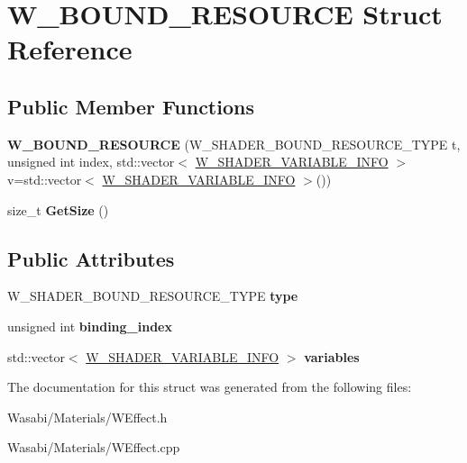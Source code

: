 \hypertarget{struct_w___b_o_u_n_d___r_e_s_o_u_r_c_e}{}\section{W\+\_\+\+B\+O\+U\+N\+D\+\_\+\+R\+E\+S\+O\+U\+R\+CE Struct Reference}
\label{struct_w___b_o_u_n_d___r_e_s_o_u_r_c_e}
\subsection*{Public Member Functions}
\begin{DoxyCompactItemize}
\item 
{\bfseries W\+\_\+\+B\+O\+U\+N\+D\+\_\+\+R\+E\+S\+O\+U\+R\+CE} (W\+\_\+\+S\+H\+A\+D\+E\+R\+\_\+\+B\+O\+U\+N\+D\+\_\+\+R\+E\+S\+O\+U\+R\+C\+E\+\_\+\+T\+Y\+PE t, unsigned int index, std\+::vector$<$ \hyperlink{struct_w___s_h_a_d_e_r___v_a_r_i_a_b_l_e___i_n_f_o}{W\+\_\+\+S\+H\+A\+D\+E\+R\+\_\+\+V\+A\+R\+I\+A\+B\+L\+E\+\_\+\+I\+N\+FO} $>$ v=std\+::vector$<$ \hyperlink{struct_w___s_h_a_d_e_r___v_a_r_i_a_b_l_e___i_n_f_o}{W\+\_\+\+S\+H\+A\+D\+E\+R\+\_\+\+V\+A\+R\+I\+A\+B\+L\+E\+\_\+\+I\+N\+FO} $>$())\hypertarget{struct_w___b_o_u_n_d___r_e_s_o_u_r_c_e_a4e37d8d03ddab7339eb6b2b9e52453bd}{}\label{struct_w___b_o_u_n_d___r_e_s_o_u_r_c_e_a4e37d8d03ddab7339eb6b2b9e52453bd}

\item 
size\+\_\+t {\bfseries Get\+Size} ()\hypertarget{struct_w___b_o_u_n_d___r_e_s_o_u_r_c_e_a4316bb3b61abf67c9c4d1816175d38d1}{}\label{struct_w___b_o_u_n_d___r_e_s_o_u_r_c_e_a4316bb3b61abf67c9c4d1816175d38d1}

\end{DoxyCompactItemize}
\subsection*{Public Attributes}
\begin{DoxyCompactItemize}
\item 
W\+\_\+\+S\+H\+A\+D\+E\+R\+\_\+\+B\+O\+U\+N\+D\+\_\+\+R\+E\+S\+O\+U\+R\+C\+E\+\_\+\+T\+Y\+PE {\bfseries type}\hypertarget{struct_w___b_o_u_n_d___r_e_s_o_u_r_c_e_aba210bfb28ce06d4ab333eeab7877222}{}\label{struct_w___b_o_u_n_d___r_e_s_o_u_r_c_e_aba210bfb28ce06d4ab333eeab7877222}

\item 
unsigned int {\bfseries binding\+\_\+index}\hypertarget{struct_w___b_o_u_n_d___r_e_s_o_u_r_c_e_ae50619693d5d7b0ce92770fedebcf7a7}{}\label{struct_w___b_o_u_n_d___r_e_s_o_u_r_c_e_ae50619693d5d7b0ce92770fedebcf7a7}

\item 
std\+::vector$<$ \hyperlink{struct_w___s_h_a_d_e_r___v_a_r_i_a_b_l_e___i_n_f_o}{W\+\_\+\+S\+H\+A\+D\+E\+R\+\_\+\+V\+A\+R\+I\+A\+B\+L\+E\+\_\+\+I\+N\+FO} $>$ {\bfseries variables}\hypertarget{struct_w___b_o_u_n_d___r_e_s_o_u_r_c_e_a700e968f2052b08e3b2747c168f91f47}{}\label{struct_w___b_o_u_n_d___r_e_s_o_u_r_c_e_a700e968f2052b08e3b2747c168f91f47}

\end{DoxyCompactItemize}


The documentation for this struct was generated from the following files\+:\begin{DoxyCompactItemize}
\item 
Wasabi/\+Materials/W\+Effect.\+h\item 
Wasabi/\+Materials/W\+Effect.\+cpp\end{DoxyCompactItemize}
